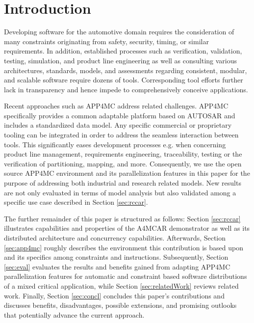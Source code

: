 \documentclass [a4paper,final,conference,10pt]{IDAACS}
\begin{document}
\section{Introduction}
Developing software for the automotive domain requires the consideration of many constraints originating from safety, security, timing, or similar requirements. In addition, established processes such as verification, validation, testing, simulation, and product line engineering as well as consulting various architectures, standards, models, and assessments regarding consistent, modular, and scalable software require dozens of tools. Corresponding tool efforts further lack in transparency and hence impede to comprehensively conceive applications. 

Recent approaches such as APP4MC\cite{app4mc}
address related challenges. APP4MC specifically provides a common adaptable platform based on AUTOSAR\cite{autosar} and includes a standardized data model. Any specific commercial or proprietary tooling can be integrated in order to address the seamless interaction between tools. This significantly eases development processes e.g. when concerning product line management, requirements engineering, traceability, testing or the verification of partitioning, mapping, and more. Consequently, we use the open source APP4MC environment and its parallelization features in this paper for the purpose of addressing both industrial and research related models. New results are not only evaluated in terms of model analysis but also validated among a specific use case described in Section \ref{sec:rccar}. 

The further remainder of this paper is structured as follows: Section \ref{sec:rccar} illustrates capabilities and properties of the A4MCAR demonstrator as well as its distributed architecture and concurrency capabilities. Afterwards, Section \ref{sec:app4mc} roughly describes the environment this contribution is based upon and its specifics among constraints and instructions. Subsequently, Section \ref{sec:eval} evaluates the results and benefits gained from adapting APP4MC parallelization features for automatic and constraint based software distributions of a mixed critical application, while Section \ref{sec:relatedWork} reviews related work.  %
Finally, Section \ref{sec:concl} concludes this paper's contributions and discusses benefits, disadvantages, possible extensions, and promising outlooks that potentially advance the current approach.
\end{document}

